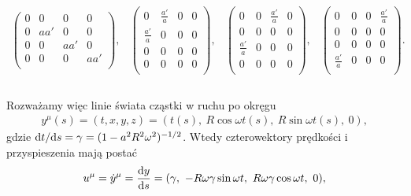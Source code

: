 $$
\begin{array}{cccc}
\left(
    \begin{array}{cccc}
    0 & 0 & 0 & 0 \\
    0 & a a' & 0 & 0 \\
    0 & 0 & a a' & 0 \\
    0 & 0 & 0 & a a' \\
    \end{array}
    \right), &
    \left(
    \begin{array}{cccc}
    0 & \frac{a'}{a} & 0 & 0 \\
    \frac{a'}{a} & 0 & 0 & 0 \\
    0 & 0 & 0 & 0 \\
    0 & 0 & 0 & 0 \\
    \end{array}
    \right), &
    \left(
    \begin{array}{cccc}
    0 & 0 & \frac{a'}{a} & 0 \\
    0 & 0 & 0 & 0 \\
    \frac{a'}{a} & 0 & 0 & 0 \\
    0 & 0 & 0 & 0 \\
    \end{array}
    \right), &
    \left(
    \begin{array}{cccc}
    0 & 0 & 0 & \frac{a'}{a} \\
    0 & 0 & 0 & 0 \\
    0 & 0 & 0 & 0 \\
    \frac{a'}{a} & 0 & 0 & 0 \\
    \end{array}
    \right). \\
\end{array}
 $$ 
 \\
Rozważamy więc linie świata cząstki w ruchu po okręgu 
\begin{align}\nonumber
y^\mu(s) = (t,x,y,z)= (t(s),\ R\cos\omega t(s),\ R\sin\omega t(s),\ 0),
\end{align}  
gdzie $\text{d} t/\text{d} s=\gamma= (1-a^2R^2\omega^2)^{-1/2}$.
Wtedy czterowektory prędkości i przyspieszenia mają postać 
\begin{align}\nonumber
u^\mu = \dot{y}^\mu = \frac{\text{d} y}{\text{d} s} = 
(\gamma,\ -R\omega\gamma\sin\omega t,
\ R\omega\gamma\cos\omega t,\ 0),
\end{align}
